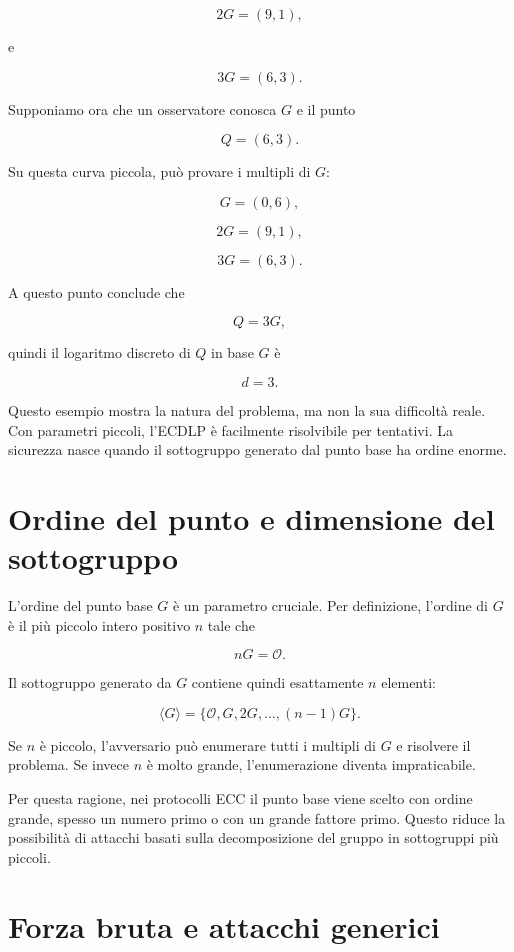 \documentclass[12pt,a4paper,oneside]{report}
\begin{document}
\[
2G = (9,1),
\]

e

\[
3G = (6,3).
\]

Supponiamo ora che un osservatore conosca \(G\) e il punto

\[
Q=(6,3).
\]

Su questa curva piccola, può provare i multipli di \(G\):

\[
G=(0,6),
\]

\[
2G=(9,1),
\]

\[
3G=(6,3).
\]

A questo punto conclude che

\[
Q=3G,
\]

quindi il logaritmo discreto di \(Q\) in base \(G\) è

\[
d=3.
\]

Questo esempio mostra la natura del problema, ma non la sua difficoltà reale. Con parametri piccoli, l'ECDLP è facilmente risolvibile per tentativi. La sicurezza nasce quando il sottogruppo generato dal punto base ha ordine enorme.

\section{Ordine del punto e dimensione del sottogruppo}

L'ordine del punto base \(G\) è un parametro cruciale. Per definizione, l'ordine di \(G\) è il più piccolo intero positivo \(n\) tale che

\begin{equation}
    nG = \mathcal{O}.
\end{equation}

Il sottogruppo generato da \(G\) contiene quindi esattamente \(n\) elementi:

\[
\langle G \rangle = \{ \mathcal{O}, G, 2G, \ldots, (n-1)G \}.
\]

Se \(n\) è piccolo, l'avversario può enumerare tutti i multipli di \(G\) e risolvere il problema. Se invece \(n\) è molto grande, l'enumerazione diventa impraticabile.

Per questa ragione, nei protocolli ECC il punto base viene scelto con ordine grande, spesso un numero primo o con un grande fattore primo. Questo riduce la possibilità di attacchi basati sulla decomposizione del gruppo in sottogruppi più piccoli.

\section{Forza bruta e attacchi generici}
\end{document}
